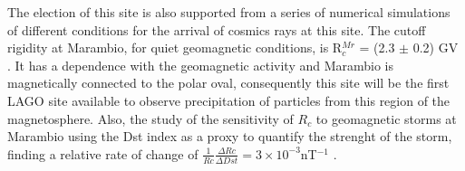 
The election of this site is also supported from a series of numerical
simulations of different conditions for the arrival of cosmics rays at this
site.  The cutoff rigidity at Marambio, for quiet geomagnetic
conditions, is R$_c^{Mr}$ = (2.3 $\pm$ 0.2) GV \cite{Masias2014}.
It has a dependence with the geomagnetic activity and Marambio is magnetically
connected to the polar oval, consequently this site will be the first LAGO site
available to observe precipitation of particles from this region of the
magnetosphere.
Also, the study of the sensitivity of $R_c$ to geomagnetic storms at Marambio using
the Dst index as a proxy to quantify the strenght of the storm, finding a
relative rate of change of $\frac{1}{Rc}\frac{\Delta Rc}{\Delta
Dst}=3\times10^{-3}$nT$^{-1}$ \cite{Masias2014}. 

